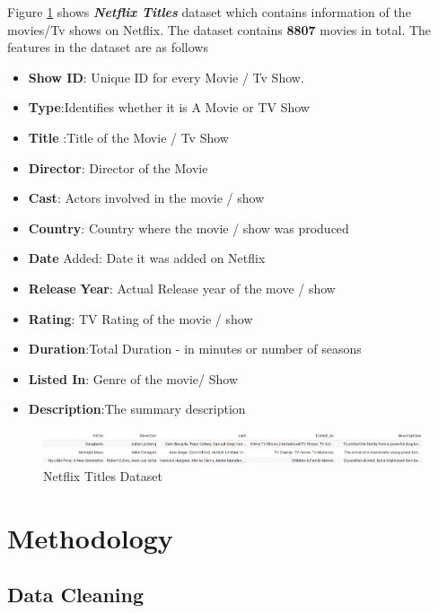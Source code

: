 \documentclass[a4paper,10pt]{article}
\begin{document}
\vspace{10pt}
Figure \ref{netflix titles} shows \textbf{\textit{Netflix Titles}} dataset which contains  information of the movies/Tv shows on Netflix. The dataset contains \textbf{8807} movies in total. The features in the dataset are as follows 
\begin{itemize}
    \item \textbf{Show ID}: Unique ID for every Movie / Tv Show. 
    \item \textbf{Type}:Identifies whether it is A Movie or TV Show 
    \item \textbf{Title} :Title of the Movie / Tv Show 
    \item \textbf{Director}: Director of the Movie
    \item \textbf{Cast}: Actors involved in the movie / show
    \item \textbf{Country}: Country where the movie / show was produced
    \item \textbf{Date} Added: Date it was added on Netflix
    \item \textbf{Release} \textbf{Year}: Actual Release year of the move / show
    \item \textbf{Rating}: TV Rating of the movie / show
    \item \textbf{Duration}:Total Duration - in minutes or number of seasons
    \item \textbf{Listed In}: Genre of the movie/ Show
    \item \textbf{Description}:The summary description 
\end{itemize}
\begin{figure}[H]
    \centering
    \includegraphics[width=1\linewidth]{figures/netflix_title.png}
    \caption{Netflix Titles Dataset}
    \label{netflix titles}
\end{figure}





\section{Methodology}

\subsection{Data Cleaning}
\end{document}
